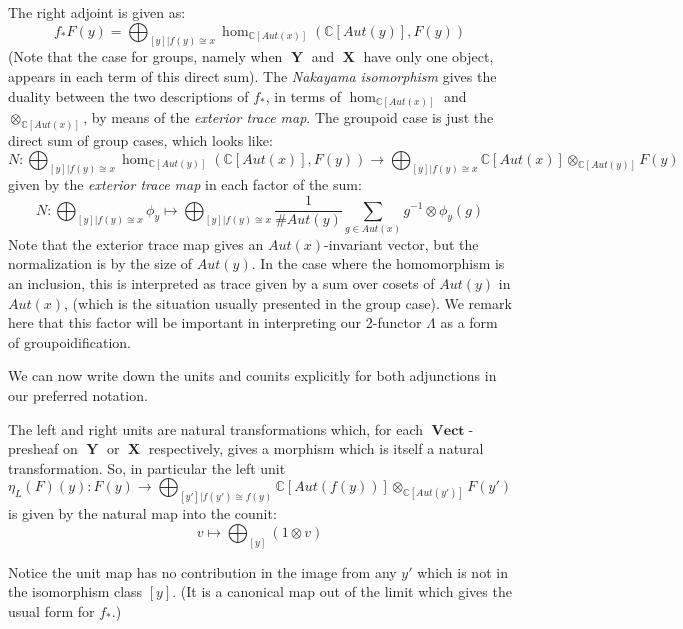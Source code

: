 \documentclass[10pt]{amsart}
\numberwithin{theorem}{subsection}
\newcommand{\ra}{\mathop{\rightarrow}}
\newcommand{\opname}[1]{\operatorname{#1}}
\newcommand{\catname}[1]{\boldsymbol{\opname{{#1}}}}
\newcommand{\X}{\catname{X}}
\newcommand{\Y}{\catname{Y}}
\newcommand{\V}{\catname{Vect}}
\newcommand{\FV}{\Lambda}
\begin{document}
The right adjoint is given as:
\begin{equation}
f_{\ast} F (y) = \bigoplus_{[y] | f(y) \cong x} \hom_{\mathbb{C}[Aut(x)]}(\mathbb{C}[Aut(y)],F(y))
\end{equation}
(Note that the case for groups, namely when $\Y$ and $\X$ have only
one object, appears in each term of this direct sum).  The
\textit{Nakayama isomorphism} gives the duality between the two
descriptions of $f_{\ast}$, in terms of $\hom_{\mathbb{C}[Aut(x)]}$
and $\otimes_{\mathbb{C}[Aut(x)]}$, by means of the \textit{exterior
trace map}.  The groupoid case is just the direct sum of group
cases, which looks like:
\begin{equation}
N : \bigoplus_{[y] | f(y) \cong x} \hom_{\mathbb{C}[Aut(y)]}(\mathbb{C}[Aut(x)],F(y)) \ra \bigoplus_{[y] | f(y) \cong x} \mathbb{C}[Aut(x)] \otimes_{\mathbb{C}[Aut(y)]} F(y)
\end{equation}
given by the \textit{exterior trace map} in each factor of the sum:
\begin{equation}\label{eq:nakayama}
N : \bigoplus_{[y] | f(y) \cong x} \phi_y \mapsto \bigoplus_{[y] | f(y) \cong x} \frac{1}{\# Aut(y)}\sum_{g \in Aut(x)} g^{-1} \otimes \phi_y(g)
\end{equation}
Note that the exterior trace map gives an $Aut(x)$-invariant vector,
but the normalization is by the size of $Aut(y)$.  In the case where
the homomorphism is an inclusion, this is interpreted as trace given
by a sum over cosets of $Aut(y)$ in $Aut(x)$, (which is the situation
usually presented in the group case).  We remark here that this factor
will be important in interpreting our 2-functor $\FV$ as a form of
groupoidification.

We can now write down the units and counits explicitly for both
adjunctions in our preferred notation.

The left and right units are natural transformations which, for each
$\V$-presheaf on $\Y$ or $\X$ respectively, gives a morphism which is
itself a natural transformation.  So, in particular the left unit
\begin{equation}\label{eq:leftunit}
\eta_L(F)(y) : F(y) \ra \bigoplus_{[y'] | f(y') \cong f(y)} \mathbb{C}[Aut(f(y))] \otimes_{\mathbb{C}[Aut(y')]} F(y')
\end{equation}
is given by the natural map into the counit:
\begin{equation}
v \mapsto \bigoplus_{[y]} (1 \otimes v)
\end{equation}

Notice the unit map has no contribution in the image from any $y'$
which is not in the isomorphism class $[y]$.  (It is a canonical map
out of the limit which gives the usual form for $f_{\ast}$.)
\end{document}

